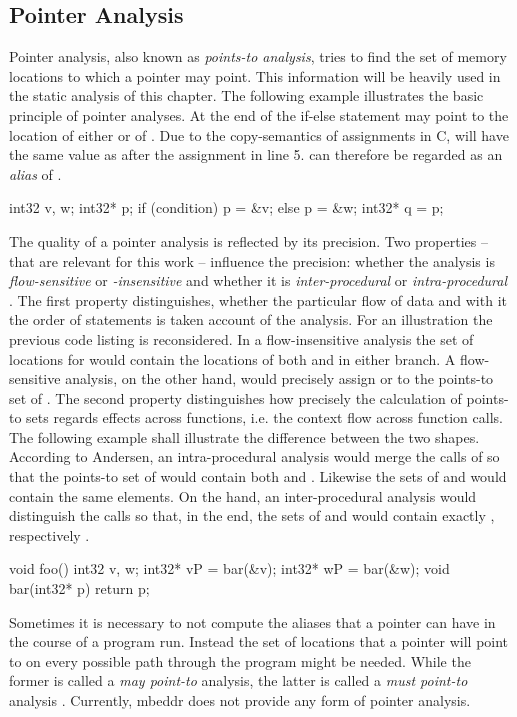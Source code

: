 \subsection{Pointer Analysis}
Pointer analysis, also known as \textit{points-to analysis}, tries to find the set of memory locations to which a pointer may point\cite{PointerAnalysisForStructuredParallelPrograms}. This information will be heavily used in the static analysis of this chapter. The following example illustrates the basic principle of pointer analyses. At the end of the if-else statement  may point to the location of either  or of . Due to the copy-semantics of assignments in C,  will have the same value as  after the assignment in line 5.  can therefore be regarded as an \textit{alias} of .
\begin{ccode}
int32 v, w;
int32* p;
if (condition)  p = &v;
else            p = &w; 
int32* q = p;
\end{ccode}
The quality of a pointer analysis is reflected by its precision. Two properties -- that are relevant for this work -- influence the precision: whether the analysis is \textit{flow-sensitive} or \textit{-insensitive} and whether it is \textit{inter-procedural} or \textit{intra-procedural} \cite{ProgramAnalysisAndSpecialization}. The first property distinguishes, whether the particular flow of data and with it the order of statements is taken account of the analysis. For an illustration the previous code listing is reconsidered. In a flow-insensitive analysis the set of locations for  would contain the locations of both  and  in either branch. A flow-sensitive analysis, on the other hand, would precisely assign  or  to the points-to set of . The second property distinguishes how precisely the calculation of points-to sets regards effects across functions, i.e. the context flow across function calls. The following example shall illustrate the difference between the two shapes. According to Andersen, an intra-procedural analysis would merge the calls of  so that the points-to set of  would contain both  and . Likewise the sets of  and  would contain the same elements. On the hand, an inter-procedural analysis would distinguish the calls so that, in the end, the sets of  and  would contain exactly , respectively .
\begin{ccode}
void foo() {
  int32 v, w;
  int32* vP = bar(&v);
  int32* wP = bar(&w);
}
void bar(int32* p) {
  return p;
}
\end{ccode}
Sometimes it is necessary to not compute the aliases that a pointer can have in the course of a program run. Instead the set of locations that a pointer will point to on every possible path through the program might be needed. While the former is called a \textit{may point-to} analysis, the latter is called a \textit{must point-to} analysis \cite{ProgramAnalysisAndSpecialization}.
Currently, mbeddr does not provide any form of pointer analysis.

